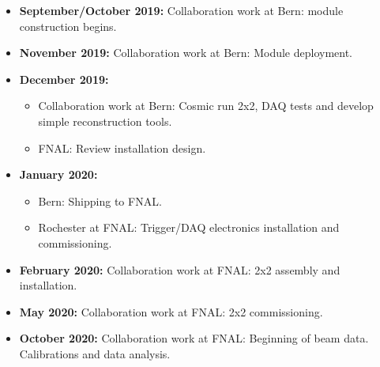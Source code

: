 \begin{itemize}
\item {\bf September/October 2019:} Collaboration work at Bern: module construction begins.
 \item {\bf November 2019:} Collaboration work at Bern: Module deployment.
\item {\bf December 2019:} 
\begin{itemize}
	\item Collaboration work at Bern: Cosmic run  2x2, DAQ tests and develop simple reconstruction tools.   
	\item FNAL: Review installation design.  
\end{itemize}
\item {\bf January 2020:}
\begin{itemize}
	\item Bern: Shipping to FNAL.
	\item Rochester at FNAL: Trigger/DAQ electronics installation and commissioning. 
\end{itemize}
\item {\bf February 2020:} Collaboration work at FNAL: 2x2 assembly and installation.
\item {\bf May 2020:} Collaboration work at FNAL: 2x2 commissioning.    
\item {\bf October 2020:} Collaboration work at FNAL: Beginning of beam data. Calibrations and data analysis.

\end{itemize}
